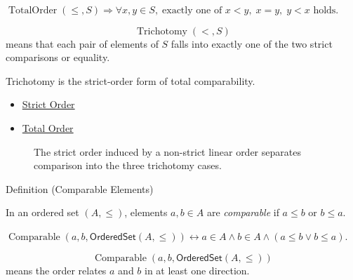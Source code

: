 \begin{remark*}
$\operatorname{TotalOrder}(\leq,S)\Rightarrow
\forall x,y\in S,\; \text{exactly one of } x<y,\;x=y,\;y<x \text{ holds}$.
\end{remark*}

\begin{remark*}
\[
  \operatorname{Trichotomy}(<,S)
\] means that each pair of elements of $S$ falls
into exactly one of the two strict comparisons or equality.
\end{remark*}

\begin{remark*}[Interpretation]
Trichotomy is the strict-order form of total comparability.
\end{remark*}

\begin{dependencies}
\begin{itemize}
  \item \hyperref[def:strict-order]{Strict Order}
  \item \hyperref[def:total-order]{Total Order}
\end{itemize}
\end{dependencies}

\begin{figure}[htbp]
\centering

\caption{The strict order induced by a non-strict linear order separates
comparison into the three trichotomy cases.}
\label{fig:order-bridge-trichotomy}
\end{figure}

\begin{definitionbox}{Definition (Comparable Elements)}
\begin{definition}\label{def:comparable}
In an ordered set $(A,\leq)$, elements $a,b \in A$ are \emph{comparable} if
$a \leq b$ or $b \leq a$.
\end{definition}
\end{definitionbox}

\begin{remark*}
$\operatorname{Comparable}(a,b,\mathsf{OrderedSet}(A,\leq))
\leftrightarrow a\in A\wedge b\in A\wedge(a\leq b\vee b\leq a)$.
\end{remark*}

\begin{remark*}
\[
  \operatorname{Comparable}(a,b,\mathsf{OrderedSet}(A,\leq))
\] means the order
relates $a$ and $b$ in at least one direction.
\end{remark*}

